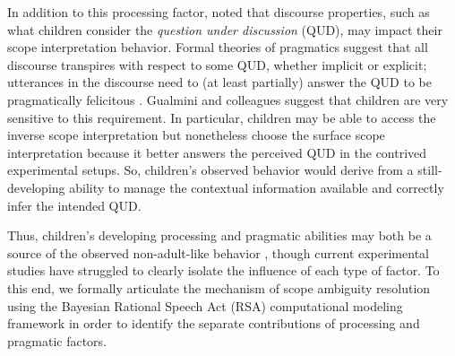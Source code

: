 \documentclass[10pt,a4paper]{article}
\begin{document}
In addition to this processing factor,  noted that discourse properties, such as what children consider the 
\textit{question under discussion} (QUD), 
may impact their scope interpretation behavior.  Formal theories of pragmatics suggest that all discourse transpires with respect to some QUD, whether implicit or explicit; utterances in the discourse need to (at least partially) answer the QUD to be pragmatically felicitous \cite{roberts2012information}. Gualmini and colleagues  suggest that children are very sensitive to this requirement.
In particular, children may be able to access the inverse scope interpretation but nonetheless choose the surface scope interpretation because it better answers the perceived QUD in the contrived experimental setups.  
So, children's observed behavior would derive from a still-developing ability to manage the contextual information available and correctly infer the intended QUD.

Thus, children's developing processing and pragmatic abilities may both be a source of the observed non-adult-like behavior \cite{viau2010priming},
though current experimental studies have struggled to clearly isolate the influence of each type of factor.
To this end, we formally articulate the mechanism of scope ambiguity resolution using the Bayesian Rational Speech Act (RSA) computational modeling framework \cite{frank2012predicting,GoodmanFrank2016} %
in order to identify the separate contributions of processing and pragmatic factors.
\end{document}
